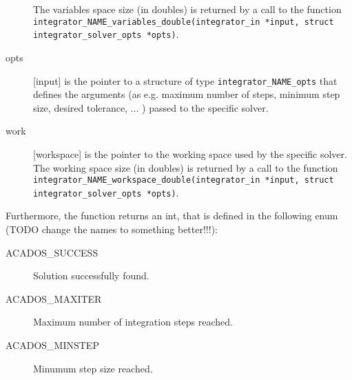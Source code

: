 \documentclass{report}
\begin{document}
\begin{description}
The variables space size (in doubles) is returned by a call to the function \\{\tt integrator\_NAME\_variables\_double(integrator\_in *input, struct integrator\_solver\_opts *opts)}. 
\item[opts] [input] is the pointer to a structure of type {\tt integrator\_NAME\_opts} that defines the arguments (as e.g. maximum number of steps, minimum step size, desired tolerance, ... ) passed to the specific solver.
\item[work] [workspace] is the pointer to the working space used by the specific solver.
The working space size (in doubles) is returned by a call to the function {\tt integrator\_NAME\_workspace\_double(integrator\_in *input, struct integrator\_solver\_opts *opts)}. 
\end{description}

Furthermore, the function returns an int, that is defined in the following enum (TODO change the names to something better!!!):
\begin{description}
\item[ACADOS\_SUCCESS] Solution successfully found.
\item[ACADOS\_MAXITER] Maximum number of integration steps reached.
\item[ACADOS\_MINSTEP] Minumum step size reached.
\end{description}



\end{document}
